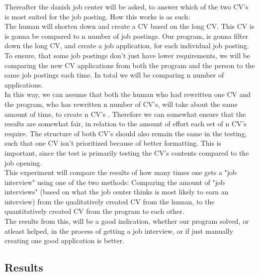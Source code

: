 Thereafter the danish job center will be asked, to answer which of the two CV's is most suited
for the job posting. How this works is as such:
\\
The human will shorten down and create a CV based on the long CV. This CV is
is gonna be compared to n number of job postings.
Our program, is gonna filter down the long CV, and create a job application,
for each individual job posting. 
To ensure, that some job postings don't just have lower requirements, we will be
comparing the new CV applications from both the program and the person to the same 
job postings each time. In total we will be comparing n number of applications.
\\
In this way, we can assume that both the human who had rewritten one
CV and the program, who has rewritten n number of CV's,
will take about the same amount of time, to create n CV's .
Therefore we can somewhat ensure that the results are somewhat fair, in relation to the amount of effort each set of n CV's require.
The structure of both CV's should also remain the same in the testing, such that one CV isn't prioritized because of better formatting.
This is important, since the test is primarily testing the CV's contents compared to the job opening.
\\
This experiment will compare the results of how many times one gets a "job
interview" using one of the two methods: Comparing the amount of 
"job interviews" (based on what the job center thinks is most likely to earn an interview) 
from the qualitatively created CV from
the human, to the quantitatively created CV from the program to
each other.
\\
The results from this, will be a good indication, whether our program solved, or
atleast helped, in the process of getting a job interview, or if just manually
creating one good application is better.

\subsection{Results}
